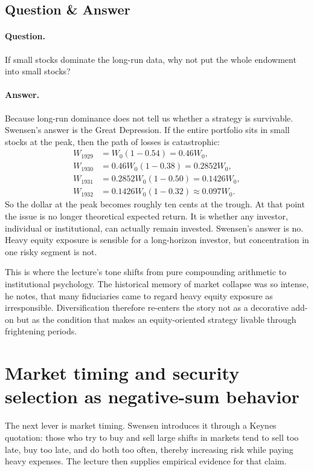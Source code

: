 \subsection{Question \& Answer}

\paragraph{Question.} If small stocks dominate the long-run data, why not put the whole endowment into small stocks?

\paragraph{Answer.} Because long-run dominance does not tell us whether a strategy is survivable. Swensen's answer is the Great Depression. If the entire portfolio sits in small stocks at the peak, then the path of losses is catastrophic:
\begin{align}
W_{1929} &= W_0(1-0.54)=0.46W_0,\\
W_{1930} &= 0.46W_0(1-0.38)=0.2852W_0,\\
W_{1931} &= 0.2852W_0(1-0.50)=0.1426W_0,\\
W_{1932} &= 0.1426W_0(1-0.32)\approx 0.097W_0.
\end{align}
So the dollar at the peak becomes roughly ten cents at the trough. At that point the issue is no longer theoretical expected return. It is whether any investor, individual or institutional, can actually remain invested. Swensen's answer is no. Heavy equity exposure is sensible for a long-horizon investor, but concentration in one risky segment is not.

This is where the lecture's tone shifts from pure compounding arithmetic to institutional psychology. The historical memory of market collapse was so intense, he notes, that many fiduciaries came to regard heavy equity exposure as irresponsible. Diversification therefore re-enters the story not as a decorative add-on but as the condition that makes an equity-oriented strategy livable through frightening periods.

\section{Market timing and security selection as negative-sum behavior}

The next lever is market timing. Swensen introduces it through a Keynes quotation: those who try to buy and sell large shifts in markets tend to sell too late, buy too late, and do both too often, thereby increasing risk while paying heavy expenses. The lecture then supplies empirical evidence for that claim.

